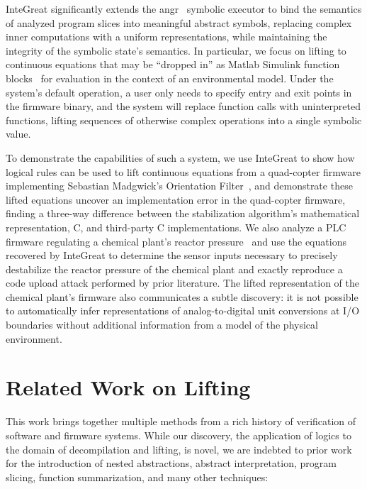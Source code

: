 InteGreat significantly extends the angr~\cite{angrsok} symbolic executor to bind the semantics of analyzed program slices into meaningful abstract symbols, replacing complex inner computations with a uniform representations, while maintaining the integrity of the symbolic state's semantics.
In particular, we focus on lifting to continuous equations that may be ``dropped in'' as Matlab Simulink function blocks~\cite{matlab} for evaluation in the context of an environmental model.
Under the system's default operation, a user only needs to specify entry and exit points in the firmware binary, and the system will replace function calls with uninterpreted functions, lifting sequences of otherwise complex operations into a single symbolic value.

To demonstrate the capabilities of such a system, we use InteGreat to show how logical rules can be used to lift continuous equations from a quad-copter firmware implementing Sebastian Madgwick's Orientation Filter~\cite{madgwick, drone}, and demonstrate these lifted equations uncover an implementation error in the quad-copter firmware, finding a three-way difference between the stabilization algorithm's mathematical representation, C, and third-party C implementations.
We also analyze a PLC firmware regulating a chemical plant's reactor pressure~\cite{ICSREF} and use the equations recovered by InteGreat to determine the sensor inputs necessary to precisely destabilize the reactor pressure of the chemical plant and exactly reproduce a code upload attack performed by prior literature.
The lifted representation of the chemical plant's firmware also communicates a subtle discovery: it is not possible to automatically infer representations of analog-to-digital unit conversions at I/O boundaries without additional information from a model of the physical environment.

\section{Related Work on Lifting}

This work brings together multiple methods from a rich history of verification of software and firmware systems.
While our discovery, the application of logics to the domain of decompilation and lifting, is novel, we are indebted to prior work for the introduction of nested abstractions, abstract interpretation, program slicing, function summarization, and many other techniques:

